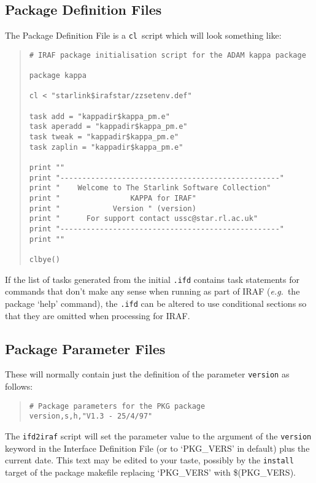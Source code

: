 \documentclass[twoside,11pt]{article}
\newcommand{\xref}[3]{#1}
\newcommand{\xlabel}[1]{}
\newcommand{\cl}{\texttt{cl}}
\begin{document}
\subsection{\xlabel{package_definition_files}Package Definition Files\label{pkg_def_files}}
The Package Definition File is a \cl\ script which will look something like:
\begin{quote} \begin{verbatim}
# IRAF package initialisation script for the ADAM kappa package

package kappa

cl < "starlink$irafstar/zzsetenv.def"

task add = "kappadir$kappa_pm.e"
task aperadd = "kappadir$kappa_pm.e"
task tweak = "kappadir$kappa_pm.e"
task zaplin = "kappadir$kappa_pm.e"

print ""
print "--------------------------------------------------"
print "    Welcome to The Starlink Software Collection"
print "                KAPPA for IRAF"
print "            Version " (version)
print "      For support contact ussc@star.rl.ac.uk"
print "--------------------------------------------------"
print ""

clbye()
\end{verbatim} \end{quote} 
If the list of tasks generated from the initial \texttt{.ifd} contains
task statements for commands that don't make any sense when running as part 
of IRAF (\textit{e.g.}\ the package `help' command), the \texttt{.ifd} can be
altered to use
\xref{conditional sections}{ssn68}{conditional_sections} 
so that they are omitted when processing for IRAF.

\subsection{\xlabel{package_parameter_files}Package Parameter Files}
These will normally contain just the definition of the parameter 
\texttt{version} as follows:
\begin{quote} \begin{verbatim}
# Package parameters for the PKG package
version,s,h,"V1.3 - 25/4/97"
\end{verbatim} \end{quote}
The 
\xref{\texttt{ifd2iraf}}{ssn68}{producing_iraf_files_from_an_ifd} 
script will set the parameter value to the argument of
the 
\xref{\texttt{version}}{ssn68}{version}
keyword in the Interface Definition File (or to `PKG\_VERS' in default) plus
the current date. This text may be edited to your taste, possibly by the 
\texttt{install} target of the package makefile replacing `PKG\_VERS' with
\$(PKG\_VERS).
\end{document}
